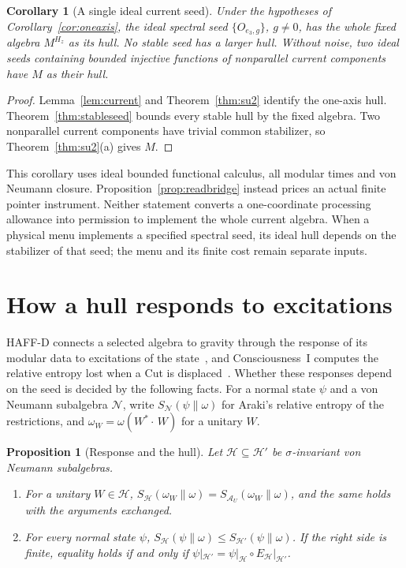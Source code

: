 \documentclass[12pt]{article}
\newtheorem{proposition}[theorem]{Proposition}
\newtheorem{corollary}[theorem]{Corollary}
\theoremstyle{definition}
\theoremstyle{remark}
\newcommand{\AU}{\mathcal A_U}
\begin{document}
\begin{corollary}[A single ideal current seed]\label{cor:onechannel}
Under the hypotheses of Corollary~\ref{cor:oneaxis}, the ideal spectral
seed $\{O_{e_3,g}\}$, $g\ne0$, has the whole fixed algebra $M^{H_z}$
as its hull. No stable seed has a larger hull. Without noise, two
ideal seeds containing bounded injective functions of nonparallel
current components have $M$ as their hull.
\end{corollary}
\begin{proof}
Lemma~\ref{lem:current} and Theorem~\ref{thm:su2} identify the one-axis
hull. Theorem~\ref{thm:stableseed} bounds every stable hull by
the fixed algebra. Two nonparallel current components have trivial
common stabilizer, so Theorem~\ref{thm:su2}(a) gives $M$.
\end{proof}

This corollary uses ideal bounded functional calculus, all modular times
and von Neumann closure. Proposition~\ref{prop:readbridge} instead
prices an actual finite pointer instrument. Neither statement converts
a one-coordinate processing allowance into permission to implement the
whole current algebra. When a physical menu implements a specified
spectral seed, its ideal hull depends on the stabilizer of that seed;
the menu and its finite cost remain separate inputs.

\section{How a hull responds to excitations}\label{sec:response}

HAFF-D connects a selected algebra to gravity through the response of its modular data
to excitations of the state~\cite{HAFFD}, and Consciousness~I computes the relative
entropy lost when a Cut is displaced~\cite{PaperI}. Whether these responses depend on
the seed is decided by the following facts. For a normal state \(\psi\) and a von
Neumann subalgebra \(\mathcal N\), write \(S_{\mathcal N}(\psi\|\omega)\) for Araki's
relative entropy of the restrictions, and \(\omega_W=\omega(W^*\cdot\,W)\) for a
unitary \(W\).

\begin{proposition}[Response and the hull]\label{prop:response}
Let \(\mathcal H\subseteq\mathcal H'\) be \(\sigma\)-invariant von Neumann subalgebras.
\begin{enumerate}[label=(\alph*),leftmargin=2em]
\item For a unitary \(W\in\mathcal H\),
  \(S_{\mathcal H}(\omega_W\|\omega)=S_{\AU}(\omega_W\|\omega)\), and the same holds with
  the arguments exchanged.
\item For every normal state \(\psi\),
  \(S_{\mathcal H}(\psi\|\omega)\le S_{\mathcal H'}(\psi\|\omega)\). If the right side is
  finite, equality holds if and only if
  \(\psi|_{\mathcal H'}=\psi|_{\mathcal H}\circ E_{\mathcal H}|_{\mathcal H'}\).
\end{enumerate}
\end{proposition}
\end{document}
